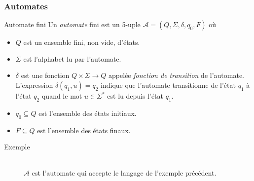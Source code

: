 \documentclass{beamer}
\begin{document}
\begin{frame}
\frametitle{Automates}
\begin{block}{Automate fini}
\noindent Un \emph{automate} fini est un 5-uple $\mathcal{A}=(Q,\Sigma,\delta,q_0,F)$ où 
\begin{itemize}
	\item $Q$ est un ensemble fini, non vide, d'états.
	\item $\Sigma$ est l'alphabet lu par l'automate.
	\item $\delta$ est une fonction $Q\times\Sigma\to Q$ appelée \emph{fonction de transition} de l'automate. L'expression $\delta(q_1,u)=q_2$ indique que l'automate transitionne de l'état $q_1$ à l'état $q_2$ quand le mot $u\in\Sigma^*$ est lu depuis l'état $q_1$.
	\item $q_0\subseteq Q$ est l'ensemble des états initiaux.
	\item $F\subseteq Q$ est l'ensemble des états finaux.
\end{itemize}
\end{block}
\begin{exampleblock}{Exemple}
\begin{figure}[H]
\centering
{}\\
$\mathcal{A}$ est l'automate qui accepte le langage de l'exemple précédent.
\end{figure}
\end{exampleblock}
\end{frame}
\end{document}
